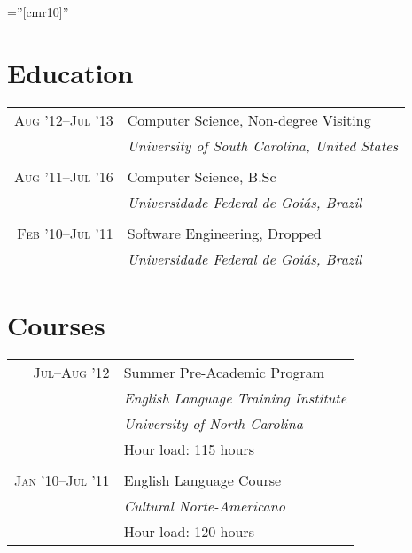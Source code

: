 \documentclass[a4paper,10pt]{article}
\begin{document}
\font\fb=''[cmr10]''


\section{Education}

\begin{tabular}{r|p{11cm}}
  \textsc{Aug '12--Jul '13} & Computer Science, Non-degree Visiting\\ &
  \emph{University of South Carolina, United States}
  \\\multicolumn{2}{c}{} \\

  \textsc{Aug '11--Jul '16} & Computer Science, B.Sc\\ &
  \emph{Universidade Federal de Goiás, Brazil}
  \\\multicolumn{2}{c}{} \\

  \textsc{Feb '10--Jul '11} & Software Engineering, Dropped\\ &
  \emph{Universidade Federal de Goiás, Brazil} \\
\end{tabular}

\section{Courses}

\begin{tabular}{r|p{11cm}}
  \textsc{Jul--Aug '12} & Summer Pre-Academic Program\\ &
  \emph{English Language Training Institute}\\ &
  \emph{University of North Carolina}\\ &
  Hour load: 115 hours
  \\\multicolumn{2}{c}{} \\

  \textsc{Jan '10--Jul '11} & English Language Course\\ &
  \emph{Cultural Norte-Americano} \\ &
  Hour load: 120 hours
\end{tabular}
\end{document}
